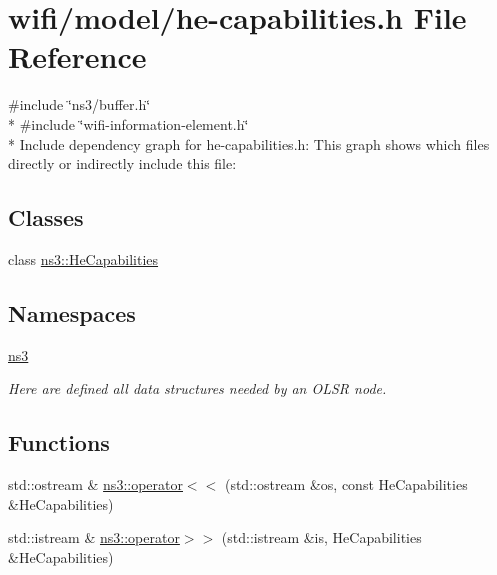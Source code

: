 \hypertarget{he-capabilities_8h}{}\section{wifi/model/he-\/capabilities.h File Reference}
\label{he-capabilities_8h}
{\ttfamily \#include \char`\"{}ns3/buffer.\+h\char`\"{}}\\*
{\ttfamily \#include \char`\"{}wifi-\/information-\/element.\+h\char`\"{}}\\*
Include dependency graph for he-\/capabilities.h\+:
This graph shows which files directly or indirectly include this file\+:
\subsection*{Classes}
\begin{DoxyCompactItemize}
\item 
class \hyperlink{classns3_1_1HeCapabilities}{ns3\+::\+He\+Capabilities}
\end{DoxyCompactItemize}
\subsection*{Namespaces}
\begin{DoxyCompactItemize}
\item 
 \hyperlink{namespacens3}{ns3}
\begin{DoxyCompactList}\small\item\em Here are defined all data structures needed by an O\+L\+SR node. \end{DoxyCompactList}\end{DoxyCompactItemize}
\subsection*{Functions}
\begin{DoxyCompactItemize}
\item 
std\+::ostream \& \hyperlink{namespacens3_a6bf3ebf8dcf3cefdac6aa91bd059268e}{ns3\+::operator$<$$<$} (std\+::ostream \&os, const He\+Capabilities \&He\+Capabilities)
\item 
std\+::istream \& \hyperlink{namespacens3_ac6b561361ff558b7034e35cb9fdf0a4a}{ns3\+::operator$>$$>$} (std\+::istream \&is, He\+Capabilities \&He\+Capabilities)
\end{DoxyCompactItemize}
